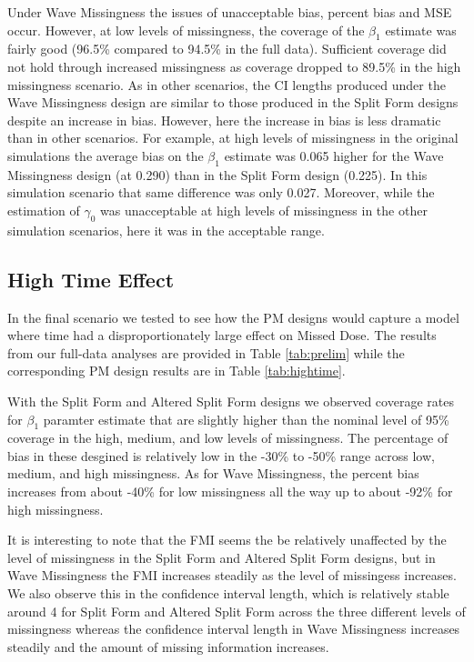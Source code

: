 \documentclass{svjour3}\usepackage[]{graphicx}\usepackage[]{color}
\begin{document}
Under Wave Missingness the issues of unacceptable bias, percent bias and MSE occur. However, at low levels of missingness, the coverage of the $\beta_1$ estimate was fairly good (96.5\% compared to 94.5\% in the full data). Sufficient coverage did not hold through increased missingness as coverage dropped to 89.5\% in the high missingness scenario. As in other scenarios, the CI lengths produced under the Wave Missingness design are similar to those produced in the Split Form designs despite an increase in bias. However, here the increase in bias is less dramatic than in other scenarios. For example, at high levels of missingness in the original simulations the average bias on the $\beta_1$ estimate was 0.065 higher for the Wave Missingness design (at 0.290) than in the Split Form design (0.225). In this simulation scenario that same difference was only 0.027. Moreover, while the estimation of $\gamma_0$ was unacceptable at high levels of missingness in the other simulation scenarios, here it was in the acceptable range.\par

\subsection{High Time Effect}
\label{sec:3.4}
In the final scenario we tested to see how the PM designs would capture a model where time had a disproportionately large effect on Missed Dose. The results from our full-data analyses are provided in Table \ref{tab:prelim} while the corresponding PM design results are in Table \ref{tab:hightime}. \par

With the Split Form and Altered Split Form designs we observed coverage rates for $\beta_1$ paramter estimate that are slightly higher than the nominal level of 95\% coverage in the high, medium, and low levels of missingness.  The percentage of bias in these desgined is relatively low in the -30\% to -50\% range across low, medium, and high missingness.  As for Wave Missingness, the percent bias increases from about -40\% for low missingness all the way up to about -92\% for high missingness.  \par

It is interesting to note that the FMI seems the be relatively unaffected by the level of missingness in the Split Form and Altered Split Form designs, but in Wave Missingness the FMI increases steadily as the level of missingess increases.  We also observe this in the confidence interval length, which is relatively stable around 4 for Split Form and Altered Split Form across the three different levels of missingness whereas the confidence interval length in Wave Missingness increases steadily and the amount of missing information increases.  \par
\end{document}
